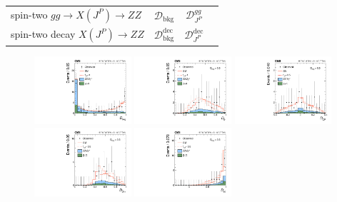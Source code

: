 \begin{table}
\begin{tabular}{cccc}
 \multicolumn{1}{l}{spin-two $gg\to X (J^P)\to ZZ$} &  $\mathcal{D}_\text{bkg}$ & $\mathcal{D}_{J^P}^{gg}$ & \\

 \multicolumn{1}{l}{spin-two decay $X (J^P)\to ZZ$}&  $\mathcal{D}_\text{bkg}^\text{dec}$ & $\mathcal{D}_{J^P}^\text{dec}$ & \\
\end{tabular}

\end{table}

\begin{figure}
\centering
\includegraphics[width=0.32\textwidth]{Spin_Parity/cCompare_DataMC_AllTeV_D_bkg.pdf}
\includegraphics[width=0.32\textwidth]{Spin_Parity/cCompare_DataMC_AllTeV_D_g1_vs_g4_phi0_SignalEnriched.pdf}
\includegraphics[width=0.32\textwidth]{Spin_Parity/cCompare_DataMC_AllTeV_D_g4int_phi0_SignalEnriched.pdf}
\includegraphics[width=0.32\textwidth]{Spin_Parity/cCompare_DataMC_AllTeV_D_g1_vs_g2_phi0_SignalEnriched.pdf}
\includegraphics[width=0.32\textwidth]{Spin_Parity/cCompare_DataMC_AllTeV_D_g2int_phi0_SignalEnriched.pdf}

\end{figure}
